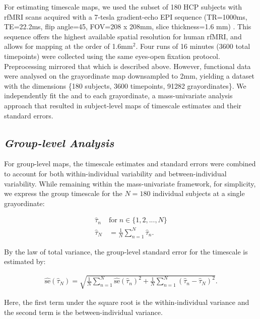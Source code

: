 \documentclass[main.tex]{subfiles}
\begin{document}
For estimating timescale maps, we used the subset of 180 HCP subjects with rfMRI scans acquired with a 7-tesla gradient-echo EPI sequence (TR=1000ms, TE=22.2ms, flip angle=45\textdegree, FOV=208 x 208mm, slice thickness=1.6 mm) \citep{van_essen_wu-minn_2013, moeller_multiband_2010}. This sequence offers the highest available spatial resolution for human rfMRI, and allows for mapping at the order of 1.6mm$^2$. Four runs of 16 minutes (3600 total timepoints) were collected using the same eyes-open fixation protocol. Preprocessing mirrored that which is described above. However, functional data were analysed on the grayordinate map downsampled to 2mm, yielding a dataset with the dimensions \{180 subjects, 3600 timepoints, 91282 grayordinates\}. We independently fit the  and  to each grayordinate, a mass-univariate analysis approach that resulted in subject-level maps of timescale estimates and their standard errors.\\

\subsection{\textit{Group-level Analysis}}\label{sec:group-level-analysis}
For group-level maps, the timescale estimates and standard errors were combined to account for both within-individual variability and between-individual variability. While remaining within the mass-univariate framework, for simplicity, we express the group timescale for the $N=180$ individual subjects at a single grayordinate:

\begin{align}
    \hat\tau_n \; &\text{for} \; n\in\{1, 2, ..., N\}\\
    \hat\tau_N &= \frac{1}{N} \sum_{n=1}^N \hat\tau_n.
\end{align}

\noindent By the law of total variance, the group-level standard error for the timescale is estimated by:

\begin{align}
    \widehat{\text{se}}(\hat\tau_N) = \sqrt{\frac{1}{N} \sum_{n=1}^N \widehat{\text{se}}(\hat\tau_n)^2 + \frac{1}{N} \sum_{n=1}^N (\hat\tau_n - \hat\tau_N)^2}.
\end{align}

\noindent Here, the first term under the square root is the within-individual variance and the second term is the between-individual variance.\\
\end{document}
